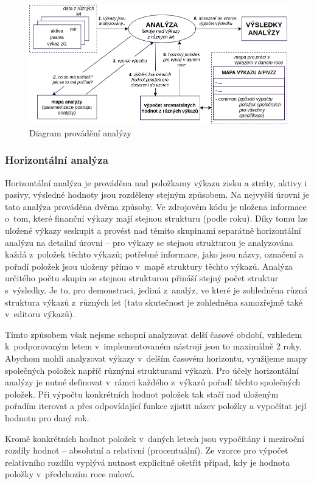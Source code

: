 \begin{figure}[!htb]
  \centering
  \includegraphics[width=14cm]{img/analysis.png}
  \caption{Diagram provádění analýzy}
\end{figure}


\subsubsection{Horizontální analýza}
Horizontální analýza je prováděna nad položkamy výkazu zisku a ztráty, aktivy i pasivy, výsledné hodnoty jsou rozděleny stejným způsobem. Na nejvyšší úrovni je tato analýza prováděna dvěma způsoby. Ve zdrojovém kódu je uložena informace o~tom, které finanční výkazy mají stejnou strukturu (podle roku). Díky tomu lze uložené výkazy seskupit a provést nad těmito skupinami separátně horizontální analýzu na detailní úrovni -- pro výkazy se stejnou strukturou je analyzována každá z~položek těchto výkazů; potřebné informace, jako jsou názvy, označení a pořadí položek jsou uloženy přímo v~mapě struktury těchto výkazů. Analýza určitého počtu skupin se stejnou strukturou přináší stejný počet struktur s~výsledky. Je to, pro demonstraci, jediná z~analýz, ve které je zohledněna různá struktura výkazů z~různých let (tato skutečnost je zohledněna samozřejmě také v~editoru výkazů).

Tímto způsobem však nejsme schopni analyzovat delší časové období, vzhledem k~podporovaným letem v~implementovaném nástroji jsou to maximálně 2 roky. Abychom mohli analyzovat výkazy v~delším časovém horizontu, využijeme mapy společných položek napříč různými strukturami výkazů. Pro účely horizontální analýzy je nutné definovat v~rámci každého z~výkazů pořadí těchto společných položek. Při výpočtu konkrétních hodnot položek tak stačí nad uloženým pořadím iterovat a přes odpovídající funkce zjistit název položky a vypočítat její hodnotu pro daný rok.

Kromě konkrétních hodnot položek v~daných letech jsou vypočítány i meziroční rozdíly hodnot -- absolutní a relativní (procentuální). Ze vzorce pro výpočet relativního rozdílu vyplývá nutnost explicitně ošetřit případ, kdy je hodnota položky v~předchozím roce nulová.

